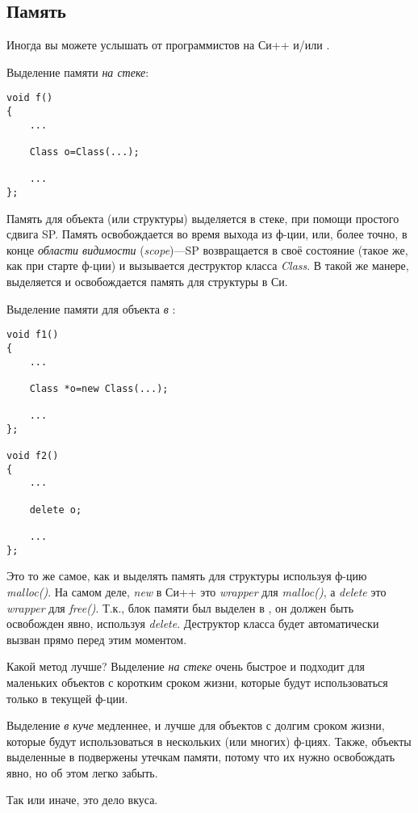 \subsection{Память}

Иногда вы можете услышать от программистов на Си++  и/или .

Выделение памяти \emph{на стеке}:

\begin{lstlisting}[style=customc]
void f()
{
	...

	Class o=Class(...);

	...
};
\end{lstlisting}

Память для объекта (или структуры) выделяется в стеке, при помощи простого сдвига \ac{SP}.
Память освобождается во время выхода из ф-ции, или, более точно, в конце \emph{области видимости} (\emph{scope})---\ac{SP}
возвращается в своё состояние (такое же, как при старте ф-ции) и вызывается деструктор класса \emph{Class}.
В такой же манере, выделяется и освобождается память для структуры в Си.

Выделение памяти для объекта \emph{в }:

\begin{lstlisting}[style=customc]
void f1()
{
	...

	Class *o=new Class(...);

	...
};

void f2()
{
	...

	delete o;

	...
};
\end{lstlisting}

Это то же самое, как и выделять память для структуры используя ф-цию \emph{malloc()}.
На самом деле, \emph{new} в Си++ это \emph{wrapper} для \emph{malloc()}, а \emph{delete} это \emph{wrapper} для \emph{free()}.
Т.к., блок памяти был выделен в , он должен быть освобожден явно, используя \emph{delete}.
Деструктор класса будет автоматически вызван прямо перед этим моментом.

Какой метод лучше?
Выделение \emph{на стеке} очень быстрое и подходит для маленьких объектов с коротким сроком жизни, которые будут использоваться
только в текущей ф-ции.

Выделение \emph{в куче} медленнее, и лучше для объектов с долгим сроком жизни, которые будут использоваться в нескольких
(или многих) ф-циях.
Также, объекты выделенные в  подвержены утечкам памяти, потому что их нужно освобождать явно, но об этом
легко забыть.

Так или иначе, это дело вкуса.
